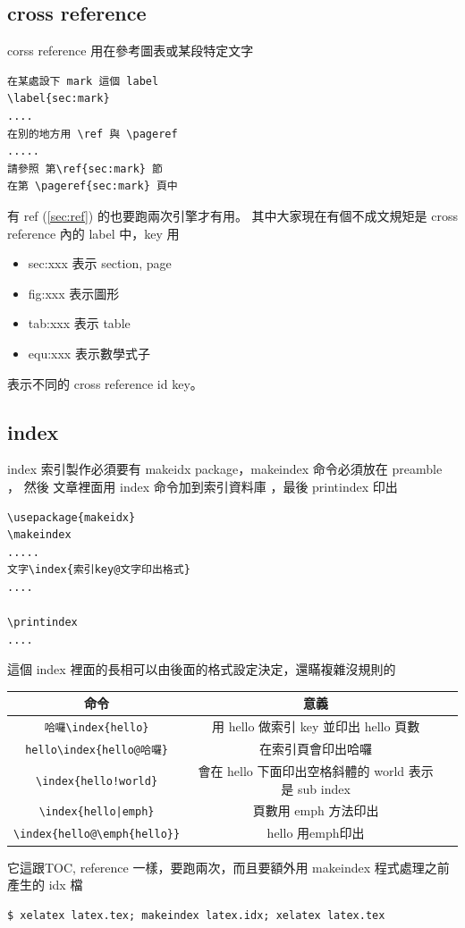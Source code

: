 \subsection{cross reference}
corss reference\label{sec:ref} 用在參考圖表或某段特定文字
\begin{verbatim}
在某處設下 mark 這個 label
\label{sec:mark}
....
在別的地方用 \ref 與 \pageref
.....
請參照 第\ref{sec:mark} 節
在第 \pageref{sec:mark} 頁中
\end{verbatim}
有 ref (\ref{sec:ref}) 的也要跑兩次引擎才有用。
其中大家現在有個不成文規矩是 cross reference 內的 label 中，key 用
\begin{itemize}
  \item sec:xxx 表示 section, page
  \item fig:xxx 表示圖形
  \item tab:xxx 表示 table
  \item equ:xxx 表示數學式子
\end{itemize}
表示不同的 cross reference id key。
\subsection{index}
index 索引製作必須要有 makeidx package，makeindex 命令必須放在 preamble ，
然後 文章裡面用 index 命令加到索引資料庫 ，最後 printindex 印出
\begin{verbatim}
\usepackage{makeidx}
\makeindex
.....
文字\index{索引key@文字印出格式}
....

\printindex
....
\end{verbatim}
這個 index 裡面的長相可以由後面的格式設定決定，還瞞複雜沒規則的
\begin{center}
\begin{tabular}{ccp{4cm}}
命令 & 意義 \\
\hline
\verb=哈囉\index{hello}= &  用 hello \index{hello} 做索引 key 並印出 hello 頁數\\
\verb=hello\index{hello@哈囉}=& 在索引頁會印出哈囉\index{hello@哈囉}\\
\verb=\index{hello!world}= & 會在 hello 下面印出空格斜體的 world \index{hello!world} 表示是 sub index\\
\verb=\index{hello|emph}= & 頁數用 emph 方法印出 \index{hello|emph} \\
\verb=\index{hello@\emph{hello}}=& hello 用emph印出\index{hello@\emph{hello}}\\
\end{tabular}
\end{center}
\printindex
它這跟TOC, reference 一樣，要跑兩次，而且要額外用 makeindex 程式處理之前產生的 idx 檔
\begin{verbatim}
$ xelatex latex.tex; makeindex latex.idx; xelatex latex.tex
\end{verbatim}
